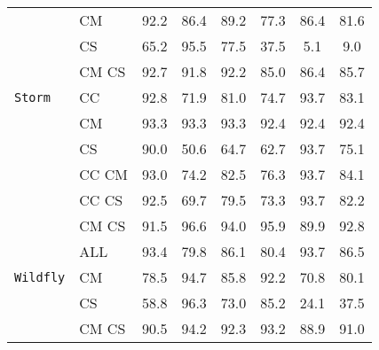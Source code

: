 {\begin{tabular}{l l | c c c | c c c}
& CM & 92.2 & 86.4 & 89.2 & 77.3 & 86.4 & 81.6 \\
& CS & 65.2 & 95.5 & 77.5 & 37.5 & 5.1 & 9.0 \\
& CM CS & 92.7 & 91.8 & 92.2 & 85.0 & 86.4 & 85.7 \\
\midrule
{\tt Storm}
& CC & 92.8 & 71.9 & 81.0 & 74.7 & 93.7 & 83.1 \\
& CM & 93.3 & 93.3 & 93.3 & 92.4 & 92.4 & 92.4 \\
& CS & 90.0 & 50.6 & 64.7 & 62.7 & 93.7 & 75.1 \\
& CC CM & 93.0 & 74.2 & 82.5 & 76.3 & 93.7 & 84.1 \\
& CC CS & 92.5 & 69.7 & 79.5 & 73.3 & 93.7 & 82.2 \\
& CM CS & 91.5 & 96.6 & 94.0 & 95.9 & 89.9 & 92.8 \\
& ALL & 93.4 & 79.8 & 86.1 & 80.4 & 93.7 & 86.5 \\
\midrule
{\tt Wildfly}
& CM & 78.5 & 94.7 & 85.8 & 92.2 & 70.8 & 80.1 \\
& CS & 58.8 & 96.3 & 73.0 & 85.2 & 24.1 & 37.5 \\
& CM CS & 90.5 & 94.2 & 92.3 & 93.2 & 88.9 & 91.0 \\

\bottomrule
\end{tabular}
}
